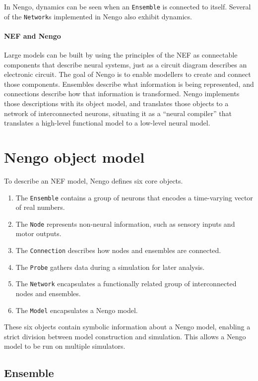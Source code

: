 \documentclass{frontiersSCNS}
\begin{document}
In Nengo, dynamics can be seen when
an \texttt{Ensemble} is connected to itself.
Several of the \texttt{Network}s
implemented in Nengo also exhibit dynamics.

\paragraph{NEF and Nengo}
Large models can be built
by using the principles of the NEF
as connectable components
that describe neural systems,
just as a circuit diagram
describes an electronic circuit.
The goal of Nengo is to enable
modellers to create and connect those components.
Ensembles describe
what information is being represented,
and connections describe
how that information is transformed.
Nengo implements those descriptions
with its object model,
and translates those objects
to a network of interconnected neurons,
situating it as a ``neural compiler''
that translates
a high-level functional model
to a low-level neural model.

\section{Nengo object model}

To describe an NEF model,
Nengo defines six core objects.
\begin{enumerate}
  \item The \texttt{Ensemble} contains a group of neurons
    that encodes a time-varying vector of real numbers.
  \item The \texttt{Node} represents non-neural information,
    such as sensory inputs and motor outputs.
  \item The \texttt{Connection} describes how
    nodes and ensembles are connected.
  \item The \texttt{Probe} gathers data during a simulation
    for later analysis.
  \item The \texttt{Network} encapsulates a functionally related
    group of interconnected nodes and ensembles.
  \item The \texttt{Model} encapsulates a Nengo model.
\end{enumerate}
These six objects contain symbolic information
about a Nengo model,
enabling a strict division between
model construction and simulation.
This allows a Nengo model
to be run on multiple simulators.

\subsection{Ensemble} \label{sec:ensemble}
\end{document}

